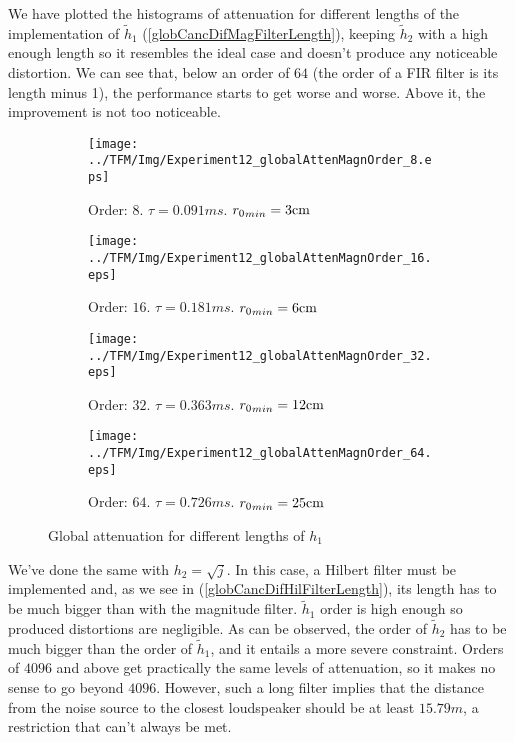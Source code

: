 We have plotted the histograms of attenuation for different lengths of the implementation of $\widetilde{h}_1$ (\autoref{globCancDifMagFilterLength}), keeping $\widetilde{h}_2$ with a high enough length so it resembles the ideal case and doesn't produce any noticeable distortion. We can see that, below an order of $64$ (the order of a FIR filter is its length minus 1), the performance starts to get worse and worse. Above it, the improvement is not too noticeable.
\begin{figure}[h]
	\centering
	\begin{subfigure}[b]{0.45\textwidth}
		\centering
		\texttt{[image: ../TFM/Img/Experiment12\_globalAttenMagnOrder\_8.eps]}
		\caption{Order: $8$. $\tau = 0.091 \si{ms}$. ${\distLinePrimSource}_{min} = 3\si{cm}$}
	\end{subfigure}
	\begin{subfigure}[b]{0.45\textwidth}
		\centering
		\texttt{[image: ../TFM/Img/Experiment12\_globalAttenMagnOrder\_16.eps]}
		\caption{Order: $16$. $\tau = 0.181 \si{ms}$. ${\distLinePrimSource}_{min} = 6\si{cm}$}
	\end{subfigure}
	\begin{subfigure}[b]{0.45\textwidth}
		\centering
		\texttt{[image: ../TFM/Img/Experiment12\_globalAttenMagnOrder\_32.eps]}
		\caption{Order: $32$. $\tau = 0.363 \si{ms}$. ${\distLinePrimSource}_{min} = 12\si{cm}$}
	\end{subfigure}
	\begin{subfigure}[b]{0.45\textwidth}
		\centering
		\texttt{[image: ../TFM/Img/Experiment12\_globalAttenMagnOrder\_64.eps]}
		\caption{Order: $64$. $\tau = 0.726 \si{ms}$. ${\distLinePrimSource}_{min} = 25\si{cm}$}
	\end{subfigure}
	
	\caption{Global attenuation for different lengths of $h_1$}
	\label{globCancDifMagFilterLength}
\end{figure}

We've done the same with $h_2 = \sqrt{j}$. In this case, a Hilbert filter must be implemented and, as we see in (\autoref{globCancDifHilFilterLength}), its length has to be much bigger than with the magnitude filter. $\widetilde{h}_1$ order is high enough so produced distortions are negligible. As can be observed, the order of $\widetilde{h}_2$ has to be much bigger than the order of $\widetilde{h}_1$, and it entails a more severe constraint. Orders of $4096$ and above get practically the same levels of attenuation, so it makes no sense to go beyond $4096$. However, such a long filter implies that the distance from the noise source to the closest loudspeaker should be at least $15.79 \si{m}$, a restriction that can't always be met.

